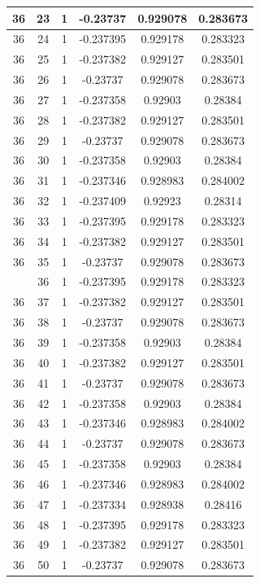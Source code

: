 \documentclass[12pt,a4paper]{article}
\numberwithin{equation}{section}
\numberwithin{figure}{section}
\numberwithin{table}{section}
\begin{document}
\begin{longtable}{|c|c|c|c|c|c|}
36 & 23 & 1 & -0.23737 & 0.929078 & 0.283673 \\ \hline
36 & 24 & 1 & -0.237395 & 0.929178 & 0.283323 \\ \hline
36 & 25 & 1 & -0.237382 & 0.929127 & 0.283501 \\ \hline
36 & 26 & 1 & -0.23737 & 0.929078 & 0.283673 \\ \hline
36 & 27 & 1 & -0.237358 & 0.92903 & 0.28384 \\ \hline
36 & 28 & 1 & -0.237382 & 0.929127 & 0.283501 \\ \hline
36 & 29 & 1 & -0.23737 & 0.929078 & 0.283673 \\ \hline
36 & 30 & 1 & -0.237358 & 0.92903 & 0.28384 \\ \hline
36 & 31 & 1 & -0.237346 & 0.928983 & 0.284002 \\ \hline
36 & 32 & 1 & -0.237409 & 0.92923 & 0.28314 \\ \hline
36 & 33 & 1 & -0.237395 & 0.929178 & 0.283323 \\ \hline
36 & 34 & 1 & -0.237382 & 0.929127 & 0.283501 \\ \hline
36 & 35 & 1 & -0.23737 & 0.929078 & 0.283673 \\ \hline
\pagebreak
36 & 36 & 1 & -0.237395 & 0.929178 & 0.283323 \\ \hline
36 & 37 & 1 & -0.237382 & 0.929127 & 0.283501 \\ \hline
36 & 38 & 1 & -0.23737 & 0.929078 & 0.283673 \\ \hline
36 & 39 & 1 & -0.237358 & 0.92903 & 0.28384 \\ \hline
36 & 40 & 1 & -0.237382 & 0.929127 & 0.283501 \\ \hline
36 & 41 & 1 & -0.23737 & 0.929078 & 0.283673 \\ \hline
36 & 42 & 1 & -0.237358 & 0.92903 & 0.28384 \\ \hline
36 & 43 & 1 & -0.237346 & 0.928983 & 0.284002 \\ \hline
36 & 44 & 1 & -0.23737 & 0.929078 & 0.283673 \\ \hline
36 & 45 & 1 & -0.237358 & 0.92903 & 0.28384 \\ \hline
36 & 46 & 1 & -0.237346 & 0.928983 & 0.284002 \\ \hline
36 & 47 & 1 & -0.237334 & 0.928938 & 0.28416 \\ \hline
36 & 48 & 1 & -0.237395 & 0.929178 & 0.283323 \\ \hline
36 & 49 & 1 & -0.237382 & 0.929127 & 0.283501 \\ \hline
36 & 50 & 1 & -0.23737 & 0.929078 & 0.283673 \\ \hline

\end{longtable}
\end{document}
